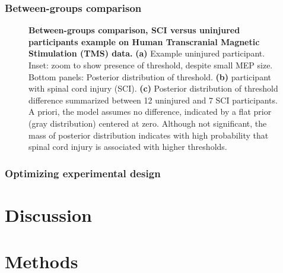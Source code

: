 \documentclass[sn-mathphys-ay]{sn-jnl}%
\theoremstyle{thmstyleone}%
\theoremstyle{thmstyletwo}%
\theoremstyle{thmstylethree}%
\begin{document}
\subsubsection{Between-groups comparison}
\begin{figure}[h]
    \centering
    \caption{\textbf{Between-groups comparison, SCI versus uninjured participants example on Human Transcranial Magnetic Stimulation (TMS) data.} \textbf{(a)} Example uninjured participant. Inset: zoom to show presence of threshold, despite small MEP size. Bottom panels: Posterior distribution of threshold. \textbf{(b)} participant with spinal cord injury (SCI). \textbf{(c)} Posterior distribution of threshold difference summarized between 12 uninjured and 7 SCI participants. A priori, the model assumes no difference, indicated by a flat prior (gray distribution) centered at zero. Although not significant, the mass of posterior distribution indicates with high probability that spinal cord injury is associated with higher thresholds.}\label{fig-between}
\end{figure}

\subsubsection{Optimizing experimental design}

\section{Discussion}\label{discussion}

\section{Methods}\label{methods}
\end{document}
